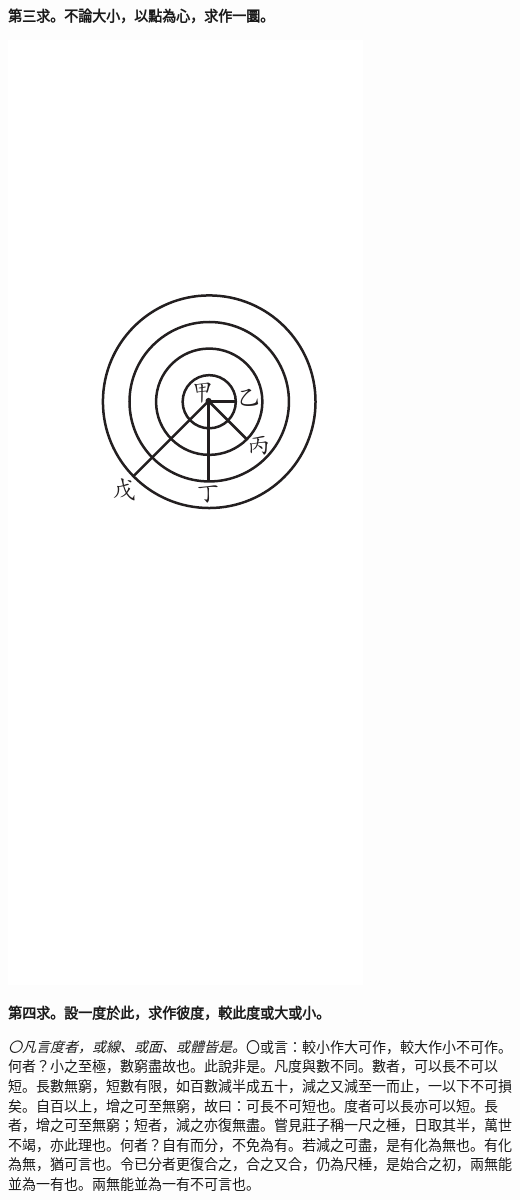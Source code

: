 \documentclass[12pt,b5paper,landscape]{article}
\newcommand{\ccom}[1]{{\footnotesize \emph{〇#1}}}
\newcommand{\bcom}[1]{〇#1}
\newcommand{\cthm}[1]{{
\vspace{8pt}

\bfseries #1}}
\begin{document}
\begin{multicols}{2}
\cthm{第三求。不論大小，以點為心，求作一圜。}
\begin{center}
\includegraphics[angle=90]{eu28}
\end{center}

\cthm{第四求。設一度於此，求作彼度，較此度或大或小。}\ccom{凡言度者，或線、或面、或體皆是。}\bcom{或言：較小作大可作，較大作小不可作。何者？小之至極，數窮盡故也。此說非是。凡度與數不同。數者，可以長不可以短。長數無窮，短數有限，如百數減半成五十，減之又減至一而止，一以下不可損矣。自百以上，增之可至無窮，故曰：可長不可短也。度者可以長亦可以短。長者，增之可至無窮；短者，減之亦復無盡。嘗見莊子稱一尺之棰，日取其半，萬世不竭，亦此理也。何者？自有而分，不免為有。若減之可盡，是有化為無也。有化為無，猶可言也。令已分者更復合之，合之又合，仍為尺棰，是始合之初，兩無能並為一有也。兩無能並為一有不可言也。}


\end{multicols}
\end{document}
